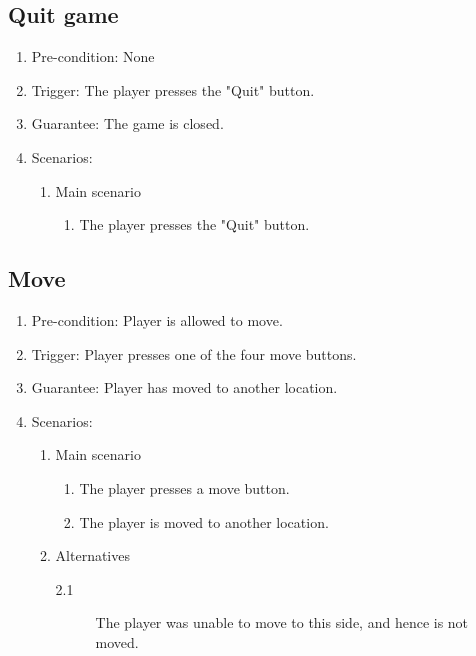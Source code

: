 \documentclass[a4paper,twoside,11pt]{article}
\begin{document}
\subsection*{Quit game}
\begin{enumerate}
\item Pre-condition: None
\item Trigger: The player presses the "Quit" button.
\item Guarantee: The game is closed.
\item Scenarios: 
	\begin{enumerate}
	\item Main scenario
		\begin{enumerate}[1)]
		\item The player presses the "Quit" button.
		\end{enumerate}
	\end{enumerate}
\end{enumerate}
\subsection*{Move}
\begin{enumerate}
\item Pre-condition: Player is allowed to move.
\item Trigger: Player presses one of the four move buttons.
\item Guarantee: Player has moved to another location.
\item Scenarios: 
	\begin{enumerate}
	\item Main scenario
		\begin{enumerate}[1)]
		\item The player presses a move button.
		\item The player is moved to another location.
		\end{enumerate}
	\item Alternatives
		\begin{description}
		\item[2.1] The player was unable to move to this side, and 		         hence is not moved.
		\end{description}
	\end{enumerate}
\end{enumerate}
\end{document}
